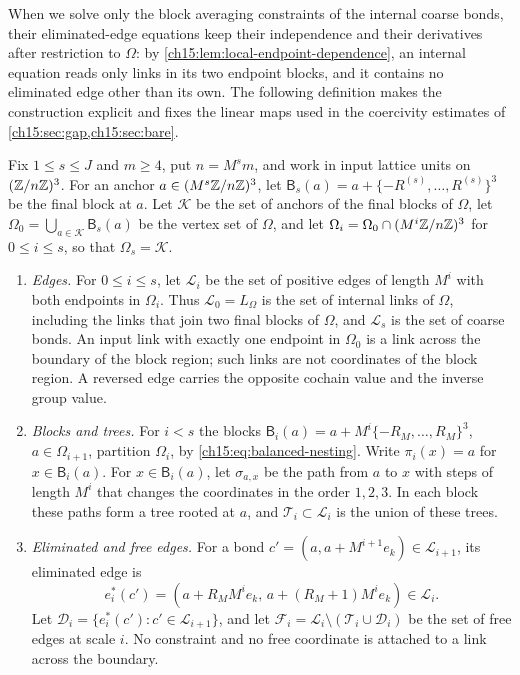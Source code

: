When we solve only the block averaging constraints of the internal coarse bonds, their eliminated-edge equations keep their independence and their derivatives after restriction to $\Omega$: by \cref{ch15:lem:local-endpoint-dependence}, an internal equation reads only links in its two endpoint blocks, and it contains no eliminated edge other than its own. The following definition makes the construction explicit and fixes the linear maps used in the coercivity estimates of \cref{ch15:sec:gap,ch15:sec:bare}.

\begin{definition}\label{ch15:def:internal-coordinates}
Fix $1\le s\le J$ and $m\ge4$, put $n=M^sm$, and work in input lattice units on $(\mathbb Z/n\mathbb Z)^3$. For an anchor $a\in(M^s\mathbb Z/n\mathbb Z)^3$, let $\mathsf B_s(a)=a+\{-R^{(s)},\ldots,R^{(s)}\}^3$ be the final block at $a$. Let $\mathcal K$ be the set of anchors of the final blocks of $\Omega$, let $\Omega_0=\bigcup_{a\in\mathcal K}\mathsf B_s(a)$ be the vertex set of $\Omega$, and let $\Omega_i=\Omega_0\cap(M^i\mathbb Z/n\mathbb Z)^3$ for $0\le i\le s$, so that $\Omega_s=\mathcal K$.
\begin{enumerate}
\item \emph{Edges.} For $0\le i\le s$, let $\mathcal L_i$ be the set of positive edges of length $M^i$ with both endpoints in $\Omega_i$. Thus $\mathcal L_0=L_\Omega$ is the set of internal links of $\Omega$, including the links that join two final blocks of $\Omega$, and $\mathcal L_s$ is the set of coarse bonds. An input link with exactly one endpoint in $\Omega_0$ is a link across the boundary of the block region; such links are not coordinates of the block region. A reversed edge carries the opposite cochain value and the inverse group value.
\item \emph{Blocks and trees.} For $i<s$ the blocks $\mathsf B_i(a)=a+M^i\{-R_M,\ldots,R_M\}^3$, $a\in\Omega_{i+1}$, partition $\Omega_i$, by \eqref{ch15:eq:balanced-nesting}. Write $\pi_i(x)=a$ for $x\in\mathsf B_i(a)$. For $x\in\mathsf B_i(a)$, let $\sigma_{a,x}$ be the path from $a$ to $x$ with steps of length $M^i$ that changes the coordinates in the order $1,2,3$. In each block these paths form a tree rooted at $a$, and $\mathcal T_i\subset\mathcal L_i$ is the union of these trees.
\item \emph{Eliminated and free edges.} For a bond $c'=(a,a+M^{i+1}e_k)\in\mathcal L_{i+1}$, its eliminated edge is
\[
 e^*_i(c')=(a+R_MM^ie_k,\,a+(R_M+1)M^ie_k)\in\mathcal L_i .
\]
Let $\mathcal D_i=\{e^*_i(c'):c'\in\mathcal L_{i+1}\}$, and let $\mathcal F_i=\mathcal L_i\setminus(\mathcal T_i\cup\mathcal D_i)$ be the set of free edges at scale $i$. No constraint and no free coordinate is attached to a link across the boundary.

\end{enumerate}
\end{definition}
